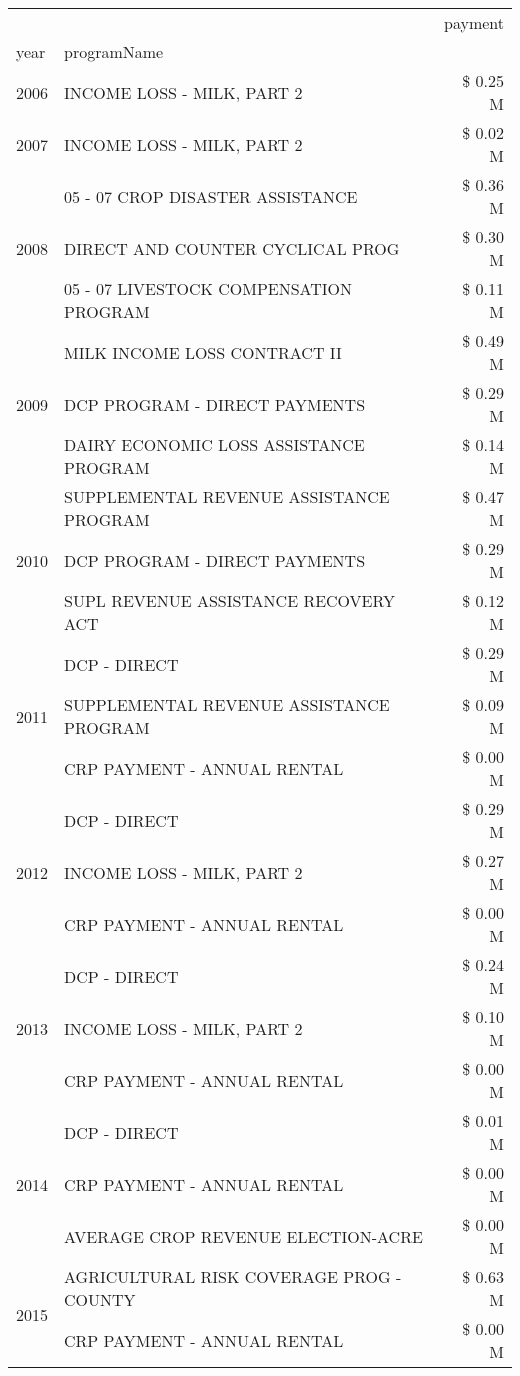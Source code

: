 \begin{tabular}{llr}
\toprule
 &  & payment \\
year & programName &  \\
\midrule
2006 & INCOME LOSS - MILK, PART 2 & \$ 0.25 M \\
\cline{1-3}
2007 & INCOME LOSS - MILK, PART 2 & \$ 0.02 M \\
\cline{1-3}
\multirow[t]{3}{*}{2008} & 05 - 07 CROP DISASTER ASSISTANCE & \$ 0.36 M \\
 & DIRECT AND COUNTER CYCLICAL PROG & \$ 0.30 M \\
 & 05 - 07 LIVESTOCK COMPENSATION PROGRAM & \$ 0.11 M \\
\cline{1-3}
\multirow[t]{3}{*}{2009} & MILK INCOME LOSS CONTRACT II & \$ 0.49 M \\
 & DCP PROGRAM - DIRECT PAYMENTS & \$ 0.29 M \\
 & DAIRY ECONOMIC LOSS ASSISTANCE PROGRAM & \$ 0.14 M \\
\cline{1-3}
\multirow[t]{3}{*}{2010} & SUPPLEMENTAL REVENUE ASSISTANCE PROGRAM & \$ 0.47 M \\
 & DCP PROGRAM - DIRECT PAYMENTS & \$ 0.29 M \\
 & SUPL REVENUE ASSISTANCE RECOVERY ACT & \$ 0.12 M \\
\cline{1-3}
\multirow[t]{3}{*}{2011} & DCP - DIRECT & \$ 0.29 M \\
 & SUPPLEMENTAL REVENUE ASSISTANCE PROGRAM & \$ 0.09 M \\
 & CRP PAYMENT - ANNUAL RENTAL & \$ 0.00 M \\
\cline{1-3}
\multirow[t]{3}{*}{2012} & DCP - DIRECT & \$ 0.29 M \\
 & INCOME LOSS - MILK, PART 2 & \$ 0.27 M \\
 & CRP PAYMENT - ANNUAL RENTAL & \$ 0.00 M \\
\cline{1-3}
\multirow[t]{3}{*}{2013} & DCP - DIRECT & \$ 0.24 M \\
 & INCOME LOSS - MILK, PART 2 & \$ 0.10 M \\
 & CRP PAYMENT - ANNUAL RENTAL & \$ 0.00 M \\
\cline{1-3}
\multirow[t]{3}{*}{2014} & DCP - DIRECT & \$ 0.01 M \\
 & CRP PAYMENT - ANNUAL RENTAL & \$ 0.00 M \\
 & AVERAGE CROP REVENUE ELECTION-ACRE & \$ 0.00 M \\
\cline{1-3}
\multirow[t]{2}{*}{2015} & AGRICULTURAL RISK COVERAGE PROG - COUNTY & \$ 0.63 M \\
 & CRP PAYMENT - ANNUAL RENTAL & \$ 0.00 M \\

\end{tabular}
